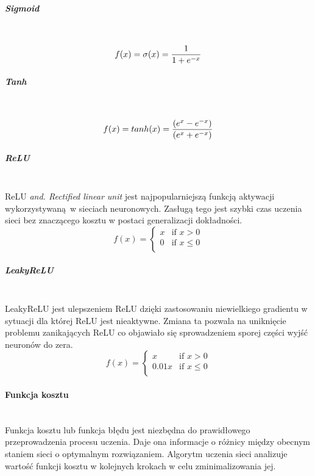 \subparagraph{Sigmoid} \mbox{}\\
\begin{equation}
f(x) = \sigma(x) = \frac{1}{1 + e^{-x}} \\
\end{equation}

\subparagraph{Tanh} \mbox{}\\
\begin{equation}
f(x) = tanh(x) = \frac{(e^x - e^{-x})}{(e^x + e^{-x})} \\
\end{equation}

\subparagraph{ReLU} \mbox{}\\
ReLU \textit{and. Rectified linear unit} jest najpopularniejszą funkcją aktywacji
wykorzystywaną w sieciach neuronowych. Zasługą tego jest szybki czas uczenia sieci
bez znaczącego kosztu w postaci generalizacji dokładności.
\begin{equation}
f(x) =
\begin{cases}
 x & \text{if } x > 0 \\
 0 & \text{if } x \leqslant 0 \\
\end{cases}
\end{equation}

\subparagraph{LeakyReLU} \mbox{}\\
LeakyReLU jest ulepszeniem ReLU dzięki zastosowaniu niewielkiego gradientu w sytuacji
dla której ReLU jest nieaktywne. Zmiana ta pozwala na uniknięcie problemu zanikających ReLU
co objawiało się sprowadzeniem sporej części wyjść neuronów do zera.
\begin{equation}
f(x) =
\begin{cases}
 x & \text{if } x > 0 \\
 0.01x & \text{if } x \leqslant 0 \\
\end{cases}
\end{equation}

\paragraph{Funkcja kosztu} \mbox{}\\
Funkcja kosztu lub funkcja błędu jest niezbędna do prawidłowego przeprowadzenia
procesu uczenia. Daje ona informacje o różnicy między obecnym staniem sieci o
optymalnym rozwiązaniem. Algorytm uczenia sieci analizuje wartość funkcji kosztu
w kolejnych krokach w celu zminimalizowania jej.

